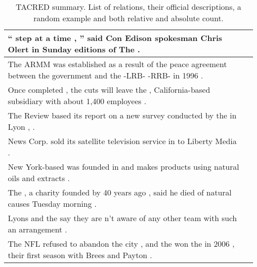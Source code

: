 \begin{longtable}{p{} P{1,3cm} }

\caption{TACRED summary. List of relations, their official descriptions, a random example and both relative and absolute count.}\\

\hline
\hline
{}  {`` \underline{} step at a time , '' said Con Edison spokesman Chris Olert in Sunday editions of The \underline{} .} &    \\ 
\hline
{}  {The ARMM was established as a result of the peace agreement between the government and the \underline{} -LRB- \underline{} -RRB- in 1996 .} &    \\ 
\hline
{}  {Once completed , the cuts will leave the \underline{} , California-based \underline{} subsidiary with about 1,400 employees .} &    \\ 
\hline
{}  {The Review based its report on a new survey conducted by the \underline{} in Lyon , \underline{} .} &    \\ 
\hline
{}  {News Corp. sold its satellite television service \underline{} in \underline{} to Liberty Media .} &    \\ 
\hline
{}  {New York-based \underline{} was founded in \underline{} and makes products using natural oils and extracts .} &    \\ 
\hline
{}  {The \underline{} , a charity founded by \underline{} 40 years ago , said he died of natural causes Tuesday morning .} &    \\ 
\hline
{}  {Lyons and the \underline{} say they are n't aware of any other \underline{} team with such an arrangement .} &    \\ 
\hline
{}  {The NFL refused to abandon the city , and the \underline{} won the \underline{} in 2006 , their first season with Brees and Payton .} &    \\ 

\end{longtable}
